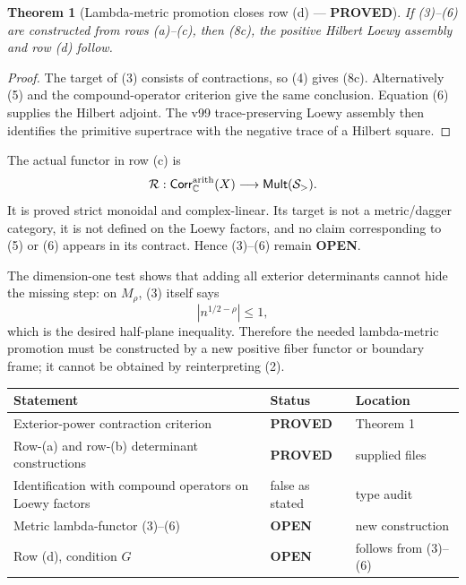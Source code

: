 \documentclass[11pt]{article}
\newcommand{\PROVED}{\textcolor{green!40!black}{\textbf{PROVED}}}
\newcommand{\OPEN}{\textcolor{red!70!black}{\textbf{OPEN}}}
\newtheorem{theorem}{Theorem}
\begin{document}
\begin{theorem}[Lambda-metric promotion closes row (d) --- \PROVED]
If (3)--(6) are constructed from rows (a)--(c), then (8c), the positive
Hilbert Loewy assembly and row (d) follow.
\end{theorem}

\begin{proof}
The target of (3) consists of contractions, so (4) gives (8c).  Alternatively
(5) and the compound-operator criterion give the same conclusion.  Equation
(6) supplies the Hilbert adjoint.  The v99 trace-preserving Loewy assembly
then identifies the primitive supertrace with the negative trace of a
Hilbert square.
\end{proof}

The actual functor in row (c) is
\[
 \mathcal R:\mathsf{Corr}^{\rm arith}_{\mathbb C}(X)
 \longrightarrow\mathsf{Mult}(\mathcal S_>).
\]
It is proved strict monoidal and complex-linear.  Its target is not a
metric/dagger category, it is not defined on the Loewy factors, and no
claim corresponding to (5) or (6) appears in its contract.  Hence
(3)--(6) remain \OPEN.

The dimension-one test shows that adding all exterior determinants cannot
hide the missing step: on $M_\rho$, (3) itself says
\[
                    |n^{1/2-\rho}|\le1,
\]
which is the desired half-plane inequality.  Therefore the needed
lambda-metric promotion must be constructed by a new positive fiber functor
or boundary frame; it cannot be obtained by reinterpreting (2).

\begin{center}
\begin{tabular}{>{\raggedright\arraybackslash}p{.58\linewidth}
                >{\centering\arraybackslash}p{.15\linewidth}
                >{\raggedright\arraybackslash}p{.17\linewidth}}
\toprule
Statement & Status & Location \\
\midrule
Exterior-power contraction criterion & \PROVED & Theorem 1 \\
Row-(a) and row-(b) determinant constructions & \PROVED & supplied files \\
Identification with compound operators on Loewy factors & false as stated & type audit \\
Metric lambda-functor (3)--(6) & \OPEN & new construction \\
Row (d), condition $G$ & \OPEN & follows from (3)--(6) \\
\bottomrule
\end{tabular}
\end{center}
\end{document}
